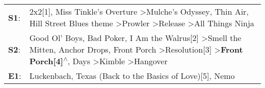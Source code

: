 \begin{supertabular}{p{0.03\textwidth}p{0.92\textwidth}}
 \textbf{S1}:  &                                                                                                                                            2x2[1]\textsuperscript{}, \enspace Miss Tinkle's Overture\textsuperscript{} \textgreater \enspace Mulche's Odyssey\textsuperscript{}, \enspace Thin Air\textsuperscript{}, \enspace Hill Street Blues theme\textsuperscript{} \textgreater \enspace Prowler\textsuperscript{} \textgreater \enspace Release\textsuperscript{} \textgreater \enspace All Things Ninja\textsuperscript{}  \enspace  \\
 \textbf{S2}:  &  Good Ol' Boys\textsuperscript{}, \enspace Bad Poker\textsuperscript{}, \enspace I Am the Walrus[2]\textsuperscript{} \textgreater \enspace Smell the Mitten\textsuperscript{}, \enspace Anchor Drops\textsuperscript{}, \enspace Front Porch\textsuperscript{} \textgreater \enspace Resolution[3]\textsuperscript{} \textgreater \enspace \textbf{Front Porch[4]\textsuperscript{$\wedge$}},  Days\textsuperscript{} \textgreater \enspace Kimble\textsuperscript{} \textgreater \enspace Hangover\textsuperscript{}  \enspace  \\
 \textbf{E1}:  &                                                                                                                                                                                                                                                                                                                                                                                                                              Luckenbach, Texas (Back to the Basics of Love)[5]\textsuperscript{}, \enspace Nemo\textsuperscript{}  \enspace  \\
\end{supertabular}
